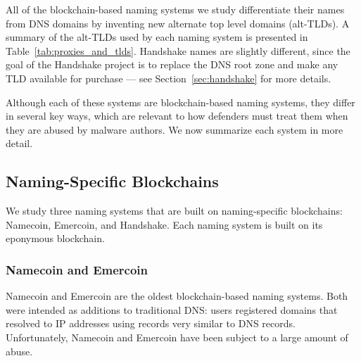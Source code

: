 All of the blockchain-based naming systems we study differentiate their names 
from DNS domains by inventing new alternate top level domains (alt-TLDs). A 
summary of the alt-TLDs used by each naming system is presented in 
Table~\ref{tab:proxies_and_tlds}. Handshake names are slightly different, since 
the goal of the Handshake project is to replace the DNS root zone and make any 
TLD available for purchase --- see Section~\ref{sec:handshake} for more details.

Although each of these systems are blockchain-based naming 
systems, they differ in several key ways, which are relevant to how defenders 
must treat them when they are abused by malware authors. We now summarize each 
system in more detail.

\subsection{Naming-Specific Blockchains}

We study three naming systems that are built on naming-specific blockchains: 
Namecoin, Emercoin, and Handshake. Each naming system is built on its eponymous 
blockchain. 

\subsubsection{Namecoin and Emercoin}

Namecoin and Emercoin are the oldest blockchain-based naming systems. Both were 
intended as additions to traditional DNS: users registered domains that 
resolved to IP addresses using records very similar to DNS records. 
Unfortunately, Namecoin and Emercoin have been subject to a large amount of 
abuse. 


